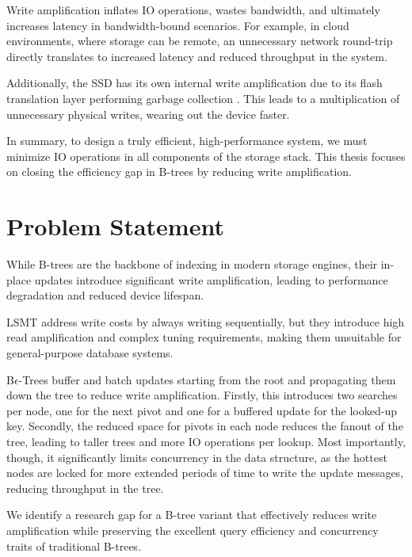 Write amplification inflates \ac{IO} operations, wastes bandwidth, and ultimately increases latency in bandwidth-bound scenarios.
For example, in cloud environments, where storage can be remote, an unnecessary network round-trip directly translates to increased latency and reduced throughput in the system.

Additionally, the \ac{SSD} has its own internal write amplification due to its flash translation layer performing garbage collection \cite{haas2023modern}. 
This leads to a multiplication of unnecessary physical writes, wearing out the device faster.

In summary, to design a truly efficient, high-performance system, we must minimize \ac{IO} operations in all components of the storage stack. 
This thesis focuses on closing the efficiency gap in B-trees by reducing write amplification.

\section{Problem Statement}
While B-trees are the backbone of indexing in modern storage engines, their in-place updates introduce significant write amplification, leading to performance degradation and reduced device lifespan. 

\ac{LSMT} address write costs by always writing sequentially, but they introduce high read amplification and complex tuning requirements, making them unsuitable for general-purpose database systems.

B$\epsilon$-Trees buffer and batch updates starting from the root and propagating them down the tree to reduce write amplification. 
Firstly, this introduces two searches per node, one for the next pivot and one for a buffered update for the looked-up key.
Secondly, the reduced space for pivots in each node reduces the fanout of the tree, leading to taller trees and more \ac{IO} operations per lookup.
Most importantly, though, it significantly limits concurrency in the data structure, as the hottest nodes are locked for more extended periods of time to write the update messages, reducing throughput in the tree.

We identify a research gap for a B-tree variant that effectively reduces write amplification while preserving the excellent query efficiency and concurrency traits of traditional B-trees.


